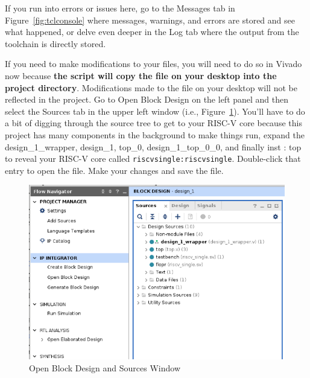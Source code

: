 \documentclass{article}
\begin{document}
\begin{enumerate}
If you run into errors or issues here, go to the Messages tab
in Figure~\ref{fig:tclconsole} where messages, warnings, and errors are stored and see
what happened, or delve even deeper in the Log tab where the output from the
toolchain is directly stored.

If you need to make modifications to your files,
you will need to do so in Vivado now because \textbf{the script will copy the
file on your desktop into the project directory}.  Modifications made to the
file on your desktop will not be reflected in the project.  Go to Open Block
Design on the left panel and then select the Sources tab in the upper left
window (i.e., Figure~\ref{fig:sources}).  You'll have to do a bit of digging through
the source tree to get to
your RISC-V core because this project has many components in the background to make
things run, expand the design\_1\_wrapper, design\_1, top\_0,
design\_1\_top\_0\_0, and finally inst : top to reveal your RISC-V core called
\verb|riscvsingle:riscvsingle|.  Double-click that entry to open the file.  Make your changes
and save the file.
\begin{figure}[h!]
  \centering
  \includegraphics[width=0.7\linewidth]{sources2}
  \caption{Open Block Design and Sources Window}
  \label{fig:sources}
\end{figure}


\end{enumerate}
\end{document}
